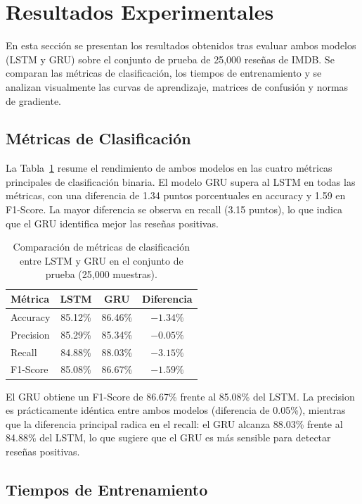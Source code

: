 \section{Resultados Experimentales}

En esta sección se presentan los resultados obtenidos tras evaluar ambos modelos (LSTM y GRU) sobre el conjunto de prueba de 25,000 reseñas de IMDB. Se comparan las métricas de clasificación, los tiempos de entrenamiento y se analizan visualmente las curvas de aprendizaje, matrices de confusión y normas de gradiente.

\subsection{Métricas de Clasificación}

La Tabla~\ref{tab:comparativa_metricas} resume el rendimiento de ambos modelos en las cuatro métricas principales de clasificación binaria. El modelo GRU supera al LSTM en todas las métricas, con una diferencia de 1.34 puntos porcentuales en accuracy y 1.59 en F1-Score. La mayor diferencia se observa en recall (3.15 puntos), lo que indica que el GRU identifica mejor las reseñas positivas.

\begin{table}[H]
\centering
\caption{Comparación de métricas de clasificación entre LSTM y GRU en el conjunto de prueba (25,000 muestras).}
\label{tab:comparativa_metricas}
\begin{tabular}{lccc}
\toprule
\textbf{Métrica} & \textbf{LSTM} & \textbf{GRU} & \textbf{Diferencia} \\
\midrule
Accuracy  & 85.12\% & 86.46\% & $-1.34\%$ \\
Precision & 85.29\% & 85.34\% & $-0.05\%$ \\
Recall    & 84.88\% & 88.03\% & $-3.15\%$ \\
F1-Score  & 85.08\% & 86.67\% & $-1.59\%$ \\
\bottomrule
\end{tabular}
\end{table}

El GRU obtiene un F1-Score de 86.67\% frente al 85.08\% del LSTM. La precision es prácticamente idéntica entre ambos modelos (diferencia de 0.05\%), mientras que la diferencia principal radica en el recall: el GRU alcanza 88.03\% frente al 84.88\% del LSTM, lo que sugiere que el GRU es más sensible para detectar reseñas positivas.

\subsection{Tiempos de Entrenamiento}

